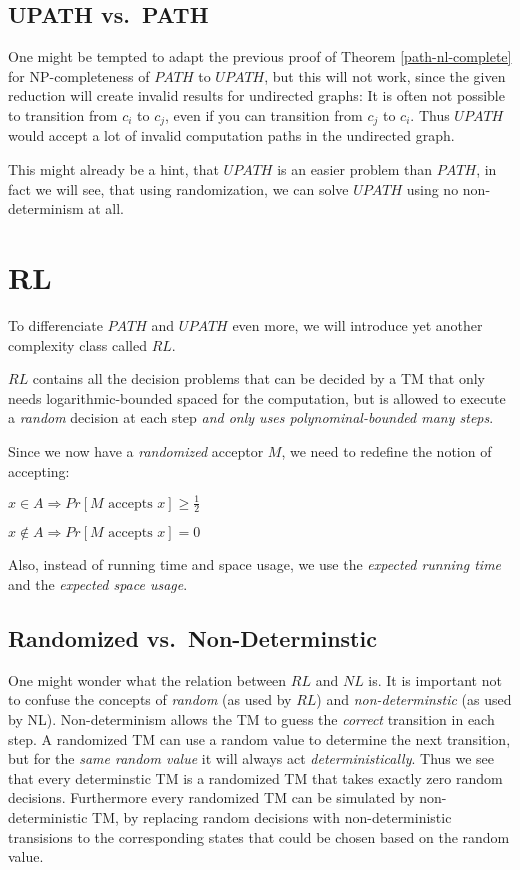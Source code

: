 \section{UPATH vs.~PATH}\label{upath-vs.path}

One might be tempted to adapt the previous proof of Theorem
\ref{path-nl-complete} for NP-completeness of $PATH$ to $UPATH$, but
this will not work, since the given reduction will create invalid
results for undirected graphs: It is often not possible to transition
from $c_i$ to $c_j$, even if you can transition from $c_j$ to $c_i$.
Thus $UPATH$ would accept a lot of invalid computation paths in the
undirected graph.

This might already be a hint, that $UPATH$ is an easier problem than
$PATH$, in fact we will see, that using randomization, we can solve
$UPATH$ using no non-determinism at all.

\chapter{RL}\label{rl}

To differenciate $PATH$ and $UPATH$ even more, we will introduce yet
another complexity class called $RL$.

$RL$ contains all the decision problems that can be decided by a TM that
only needs logarithmic-bounded spaced for the computation, but is
allowed to execute a \emph{random} decision at each step \emph{and only
uses polynominal-bounded many steps}.

Since we now have a \emph{randomized} acceptor $M$, we need to redefine
the notion of accepting:

$x \in A \Rightarrow Pr[M \text{ accepts } x] \geq \frac{1}{2}$

$x \not \in A \Rightarrow Pr[M \text{ accepts } x] = 0$

Also, instead of running time and space usage, we use the \emph{expected
running time} and the \emph{expected space usage}.

\section{Randomized
vs.~Non-Determinstic}\label{randomized-vs.non-determinstic}

One might wonder what the relation between $RL$ and $NL$ is. It is
important not to confuse the concepts of \emph{random} (as used by $RL$)
and \emph{non-determinstic} (as used by NL). Non-determinism allows the
TM to guess the \emph{correct} transition in each step. A randomized TM
can use a random value to determine the next transition, but for the
\emph{same random value} it will always act \emph{deterministically}.
Thus we see that every determinstic TM is a randomized TM that takes
exactly zero random decisions. Furthermore every randomized TM can be
simulated by non-deterministic TM, by replacing random decisions with
non-deterministic transisions to the corresponding states that could be
chosen based on the random value.

